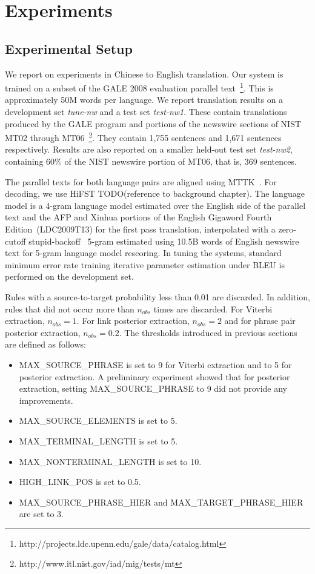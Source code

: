 \section{Experiments}
\label{sec:extractionFromPosteriorsExperiments}

\subsection{Experimental Setup}
\label{sec:extractionFromPosteriorsExperimentalSetup}

We report on experiments in Chinese to English translation. Our system is
trained on a subset of the GALE 2008 evaluation parallel
text~\footnote{http://projects.ldc.upenn.edu/gale/data/catalog.html}. This is
approximately 50M words per language. We report translation results on a
development set {\it tune-nw} and a test set {\it test-nw1}. These contain
translations produced by the GALE program and portions of the newswire sections
of NIST MT02 through MT06~\footnote{http://www.itl.nist.gov/iad/mig/tests/mt}.
They contain 1,755 sentences and 1,671 sentences respectively. Results are also
reported on a smaller held-out test set {\it test-nw2}, containing 60\% of the
NIST newswire portion of MT06, that is, 369 sentences.

The parallel texts for both language pairs are aligned using
MTTK~\citep{deng-byrne:2005:HLTEMNLP,deng-and-byrne:2008:ASLP}. For decoding,
we use HiFST TODO(reference to background chapter). The language model
is a 4-gram language model estimated over the English side of the parallel text
and the AFP and Xinhua portions of the English Gigaword Fourth
Edition~(LDC2009T13) for the first pass translation, interpolated with a
zero-cutoff stupid-backoff~\citep{brants-popat-xu-och-dean:2007:EMNLP-CoNLL}
5-gram estimated using 10.5B words of English newswire text for 5-gram language
model rescoring. In tuning the systems, standard minimum error rate training
iterative parameter estimation under BLEU is performed on the development set.

Rules with a source-to-target probability less than 0.01 are discarded. In
addition, rules that did not occur more than $n_{obs}$ times are discarded. For
Viterbi extraction, $n_{obs} = 1$. For link posterior extraction, $n_{obs} = 2$
and for phrase pair posterior extraction, $n_{obs} = 0.2$.
The thresholds introduced in previous sections are defined as follows:
%
\begin{itemize}
  \item MAX\_SOURCE\_PHRASE is set to 9 for Viterbi extraction and to 5 for
posterior extraction. A preliminary experiment showed that for posterior
extraction, setting MAX\_SOURCE\_PHRASE to 9 did not provide any improvements.
  \item MAX\_SOURCE\_ELEMENTS is set to 5.
  \item MAX\_TERMINAL\_LENGTH is set to 5.
  \item MAX\_NONTERMINAL\_LENGTH is set to 10.
  \item HIGH\_LINK\_POS is set to 0.5.
  \item MAX\_SOURCE\_PHRASE\_HIER and MAX\_TARGET\_PHRASE\_HIER are set to 3.
\end{itemize}


